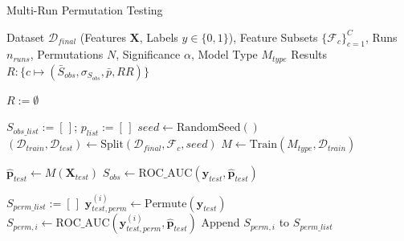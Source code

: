 \begin{algorithm}[H]
  \caption{Multi-Run Permutation Testing}
  \label{alg:permutation_testing_symbolic} %
  \begin{algorithmic}[1] %
    \footnotesize %

    \Require %
    \Statex \hspace{\algorithmicindent} Dataset $\mathcal{D}_{final}$ (Features $\mathbf{X}$, Labels $y \in \{0,1\}$),
    \Statex \hspace{\algorithmicindent} Feature Subsets $\{\mathcal{F}_c\}_{c=1}^C$,
    \Statex \hspace{\algorithmicindent} Runs $n_{runs}$, Permutations $N$, Significance $\alpha$, Model Type $M_{type}$
    \Ensure %
    \Statex \hspace{\algorithmicindent} Results $R : \{c \mapsto (\bar{S}_{obs}, \sigma_{S_{obs}}, \bar{p}, RR)\}$ 
    \medskip

    \State $R := \emptyset$ 
    \medskip

    \State $S_{obs\_list} := [\,]$; $p_{list} := [\,]$ 
    \medskip
    \State $seed \leftarrow \text{RandomSeed}()$
    \State $(\mathcal{D}_{train}, \mathcal{D}_{test}) \leftarrow \text{Split}(\mathcal{D}_{final}, \mathcal{F}_c, seed)$ 
    \State $M \leftarrow \text{Train}(M_{type}, \mathcal{D}_{train})$ 
    \medskip

    \State $\hat{\mathbf{p}}_{test} \leftarrow M(\mathbf{X}_{test})$ 
    \State $S_{obs} \leftarrow \text{ROC\_AUC}(\mathbf{y}_{test}, \hat{\mathbf{p}}_{test})$ 
    \medskip

    \State $S_{perm\_list} := [\,]$
    \State $\mathbf{y}_{test, perm}^{(i)} \leftarrow \text{Permute}(\mathbf{y}_{test})$ 
    \State $S_{perm, i} \leftarrow \text{ROC\_AUC}(\mathbf{y}_{test, perm}^{(i)}, \hat{\mathbf{p}}_{test})$ 
    \State Append $S_{perm, i}$ to $S_{perm\_list}$
    \EndFor
    \medskip


\end{algorithmic}
\end{algorithm}
